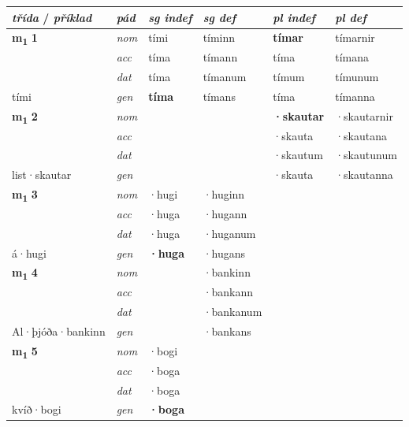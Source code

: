 \begin{longtable}[l]{X>{\footnotesize\itshape}XXXXX}
\toprule
{\textbf{\textit{třída}} / \textit{příklad}} & {\textit{pád}} & {\textit{sg indef}} & {\textit{sg def}} & {\textit{pl indef}} & {\textit{pl def}}\\
\midrule
\endhead
\multirow{3}{*}{{{\textbf{m{\textsubscript{1}}} \Large{\textbf{1}}}}} & nom & tími & tíminn & \textbf{tímar} & tímarnir \\*
 & acc & tíma & tímann & tíma & tímana \\*
 & dat & tíma & tímanum & tímum & tímunum \\*
 {\footnotesize{tími}} & gen & \textbf{tíma} & tímans & tíma & tímanna \\
\midrule

\multirow{3}{*}{{{\textbf{m{\textsubscript{1}}} \Large{\textbf{2}}}}} & nom &  &  & \textbf{·skautar} & ·skautarnir \\*
 & acc &  &  & ·skauta & ·skautana \\*
 & dat &  &  & ·skautum & ·skautunum \\*
 {\footnotesize{list\allowbreak ·skautar}} & gen & \textbf{} &  & ·skauta & ·skautanna \\
\midrule

\multirow{3}{*}{{{\textbf{m{\textsubscript{1}}} \Large{\textbf{3}}}}} & nom & ·hugi & ·huginn & \textbf{} &  \\*
 & acc & ·huga & ·hugann &  &  \\*
 & dat & ·huga & ·huganum &  &  \\*
 {\footnotesize{á\allowbreak ·hugi}} & gen & \textbf{·huga} & ·hugans &  &  \\
\midrule

\multirow{3}{*}{{{\textbf{m{\textsubscript{1}}} \Large{\textbf{4}}}}} & nom &  & ·bankinn & \textbf{} &  \\*
 & acc &  & ·bankann &  &  \\*
 & dat &  & ·bankanum &  &  \\*
 {\footnotesize{Al\allowbreak ·þjóða\allowbreak ·bankinn}} & gen & \textbf{} & ·bankans &  &  \\
\midrule

\multirow{3}{*}{{{\textbf{m{\textsubscript{1}}} \Large{\textbf{5}}}}} & nom & ·bogi &  & \textbf{} &  \\*
 & acc & ·boga &  &  &  \\*
 & dat & ·boga &  &  &  \\*
 {\footnotesize{kvíð\allowbreak ·bogi}} & gen & \textbf{·boga} &  &  &  \\
\midrule


\end{longtable}
